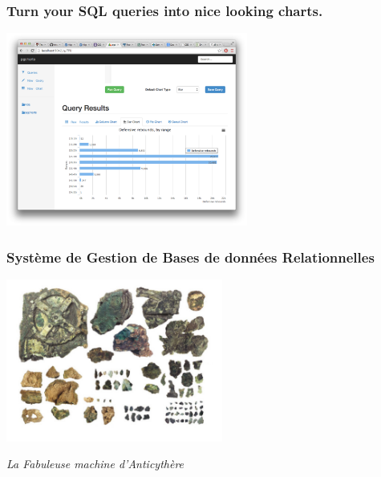 \documentclass{beamer}
\begin{document}
\begin{frame}
  \frametitle{Turn your SQL queries into nice looking charts.}


  \begin{center}
    \includegraphics[height=2.5in]{pgcharts-bar-chart.png}
  \end{center}
\end{frame}

\begin{frame}
  \frametitle{Système de Gestion de Bases de données Relationnelles}

  \begin{center}
    \includegraphics[height=2.1in]{machine-d-Anticythere-c.jpg}
  \end{center}

  \vfill
  \begin{center}
    \textit{La Fabuleuse machine d'Anticythère}
  \end{center}
\end{frame}
\end{document}
